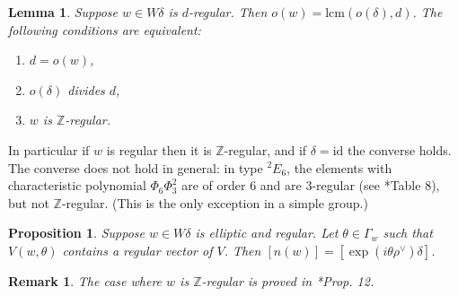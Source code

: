 \documentclass[10pt,leqno]{article}
\newtheorem{lemma}[equation]{Lemma}
\newtheorem{proposition}[equation]{Proposition}
\newtheorem{remark}[equation]{Remark}
{\theorembodyfont{\rmfamily}
\newtheorem{theoremplain}[equation]{Theorem}
\newtheorem{remarkplain}[equation]{Remark}
\newtheorem{editorialremarkplain}[equation]{Editorial Remark}
\newtheorem{exampleplain}[equation]{Example}
\newtheorem{corollaryplain}[equation]{Corollary}
}
\newcommand{\Z}{\mathbb Z}
\def\G{\Gamma}
\def\d{\delta}
\begin{document}
\begin{lemma} Suppose $w\in W\delta$ is $d$-regular.  Then
$o(w)=\text{lcm}(o(\delta),d)$.  The following conditions are
equivalent:
	\begin{enumerate}
		\item $d=o(w)$,
		\item $o(\delta)$ divides $d$,
		\item $w$ is $\mathbb Z$-regular.
	\end{enumerate}
\end{lemma}

In particular if $w$ is regular then it is $\Z$-regular, and if $\delta=\text{id}$ the converse holds.
The converse does not hold in general:
in type ${}^2 E_6$, the elements with characteristic
polynomial $\Phi_6 \Phi_3^2$ are of order $6$ and are $3$-regular (see
\cite{springer_regular}*{Table 8}), but not $\Z$-regular. (This is the only exception
in a simple group.)

\begin{proposition}\label{regular} Suppose $w \in W\d$ is elliptic and
regular. Let $\theta \in \G_w$ such that $V(w, \theta)$ contains a
regular vector of $V$. Then $[n(w)]=[\exp(i \theta\rho^\vee)\delta]$.
\end{proposition}
\begin{remark}
The case where $w$ is $\mathbb Z$-regular is proved in \cite{rgly}*{Prop. 12}. 
\end{remark}
\end{document}
